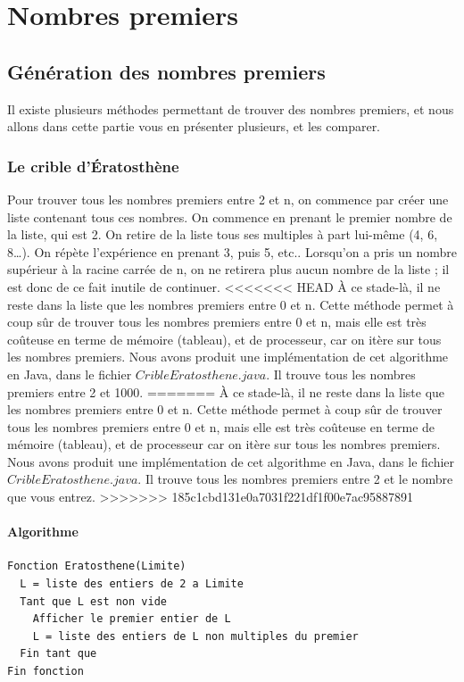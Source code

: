\chapter{Nombres premiers}
	\section{Génération des nombres premiers}
		Il existe plusieurs méthodes permettant de trouver des nombres premiers, et nous allons dans cette partie vous en présenter plusieurs, et les comparer.
		\subsection{Le crible d'Ératosthène}
			Pour trouver tous les nombres premiers entre 2 et n, on commence par créer une liste contenant tous ces nombres.
			On commence en prenant le premier nombre de la liste, qui est 2. On retire de la liste tous ses multiples à part lui-même (4, 6, 8…). On répète l’expérience en prenant 3, puis 5, etc..
			Lorsqu’on a pris un nombre supérieur à la racine carrée de n, on ne retirera plus aucun nombre de la liste ; il est donc de ce fait inutile de continuer.
<<<<<<< HEAD
			À ce stade-là, il ne reste dans la liste que les nombres premiers entre 0 et n. Cette méthode permet à coup sûr de trouver tous les nombres premiers entre 0 et n, mais elle est très coûteuse en terme de mémoire (tableau), et de processeur, car on itère sur tous les nombres premiers. Nous avons produit une implémentation de cet algorithme en Java, dans le fichier $CribleEratosthene.java$. Il trouve tous les nombres premiers entre 2 et 1000.
=======
			À ce stade-là, il ne reste dans la liste que les nombres premiers entre 0 et n. Cette méthode permet à coup sûr de trouver tous les nombres premiers entre 0 et n, mais elle est très coûteuse en terme de mémoire (tableau), et de processeur car on itère sur tous les nombres premiers. Nous avons produit une implémentation de cet algorithme en Java, dans le fichier $CribleEratosthene.java$. Il trouve tous les nombres premiers entre 2 et le nombre que vous entrez.
>>>>>>> 185c1cbd131e0a7031f221df1f00e7ac95887891
			\subsubsection{Algorithme}
				\begin{lstlisting}
Fonction Eratosthene(Limite)
  L = liste des entiers de 2 a Limite
  Tant que L est non vide
    Afficher le premier entier de L
    L = liste des entiers de L non multiples du premier
  Fin tant que
Fin fonction
				\end{lstlisting}
